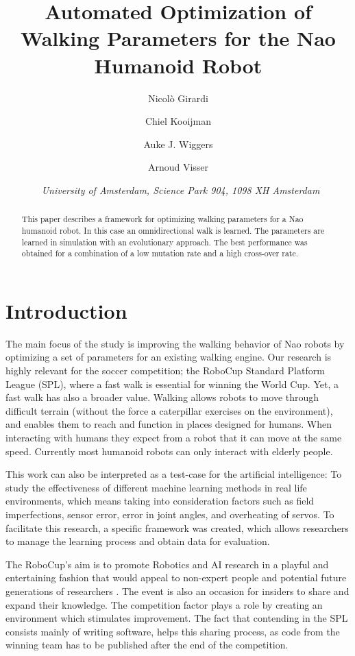 \documentclass{article}
\title{\huge Automated Optimization of Walking Parameters for the Nao Humanoid Robot}
\author{Nicol\`o Girardi \affila \and
	Chiel Kooijman \affila \and
	Auke J. Wiggers \affila \and 
	Arnoud Visser \affila}
\date{\affila\ \textit{University of Amsterdam, Science Park 904, 1098 XH Amsterdam}}
\begin{document}
\ttl
\thispagestyle{empty}

\begin{abstract}
	\noindent
	This paper describes a framework for optimizing walking parameters for a
	Nao humanoid robot. In this case an omnidirectional
	walk is learned. The parameters are learned in simulation with an evolutionary
	approach. The best performance was obtained for a combination of a low mutation rate
	and a high cross-over rate. 
\end{abstract}

\section{Introduction}
The main focus of the study is improving the walking behavior of Nao robots by
optimizing a set of parameters for an existing walking engine. Our research is
highly relevant for the soccer competition; the RoboCup Standard Platform League
(SPL), where a fast walk is essential for winning the World Cup. Yet, a fast walk
has also a broader value. Walking allows robots to move through difficult terrain 
(without the force a caterpillar exercises on the environment), and enables them to reach and function in
places designed for humans. When interacting with humans they expect from a robot that
it can move at the same speed. Currently most humanoid robots can only interact with elderly people.

This work can also be interpreted as a test-case for the artificial intelligence:
To study the effectiveness of different machine learning methods in real
life environments, which means taking into consideration factors such as field
imperfections, sensor error, error in joint angles, and overheating of servos.
To facilitate this research, a specific framework was created, which allows
researchers to manage the learning process and obtain data for evaluation. 

The RoboCup's aim is to promote Robotics and AI research in a playful and
entertaining fashion that would appeal to non-expert people and potential
future generations of researchers \cite{kitano1997robocup}. The event is also
an occasion for insiders to share and expand their knowledge. The competition
factor plays a role by creating an environment which stimulates improvement.
The fact that contending in the SPL consists mainly of writing software, helps
this sharing process, as code from the winning team has to be published after
the end of the competition. 
\end{document}
